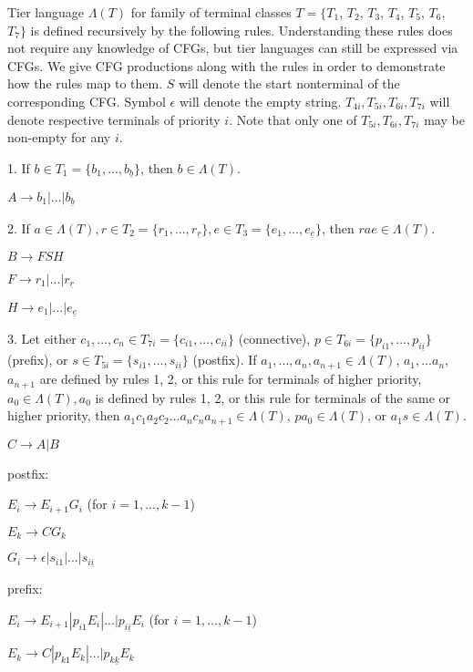 \documentclass{llncs}
\begin{document}
Tier language $\Lambda(T)$ for family of terminal classes $T = \{ T_1$, $T_2$, $T_3$, $T_4$, $T_5$, $T_6$, $T_7 \}$ is defined recursively by the following rules. Understanding these rules does not require any knowledge of CFGs, but tier languages can still be expressed via CFGs. We give CFG productions along with the rules in order to demonstrate how the rules map to them. $S$ will denote the start nonterminal of the corresponding CFG. Symbol $\epsilon$ will denote the empty string. $T_{4i}, T_{5i}, T_{6i}, T_{7i}$ will denote respective terminals of priority $i$. Note that only one of $T_{5i}, T_{6i}, T_{7i}$ may be non-empty for any $i$.

1. If $b \in T_1 = \{ b_1,...,b_{\underline b} \}$, then $b \in \Lambda(T)$.

\noindent
$A \rightarrow b_1 | ... | b_{\underline b}$

2. If $a \in \Lambda(T),  r \in T_2 = \{ r_1,...,r_{\underline r} \},  e \in T_3 = \{ e_1,...,e_{\underline e} \}$, then  $r a e \in  \Lambda(T)$.

\noindent
$B \rightarrow F S H$

\noindent
$F \rightarrow r_1 | ... | r_{\underline r}$

\noindent
$H \rightarrow e_1 | ... | e_{\underline e}$

3. Let either $c_1,...,c_n \in T_{7i} = \{ c_{i1},...,c_{i \underline i} \}$ (connective), $p \in T_{6i} = \{ p_{i1},...,p_{i \underline i} \}$ (prefix), or $s \in T_{5i} = \{ s_{i1},...,s_{i \underline i} \}$ (postfix). If $a_1,...,a_n, a_{n+1} \in \Lambda(T)$, $a_1,...a_n$, $a_{n+1}$ are defined by rules 1, 2, or this rule for terminals of higher priority, $a_0 \in \Lambda(T), a_0$ is defined by rules 1, 2, or this rule for terminals of the same or higher priority, then $a_1 c_1 a_2 c_2 ... a_n c_n a_{n+1} \in \Lambda(T)$, $p a_0 \in \Lambda(T)$, or $a_1 s \in \Lambda(T)$.

\noindent
$C \rightarrow A | B$

postfix:

\noindent
$E_i \rightarrow E_{i+1} G_i$ (for $i = 1,...,k-1$)

\noindent 
$E_k \rightarrow C G_k$

\noindent
$G_i \rightarrow \epsilon | s_{i1} | ... | s_{i \underline i}$

prefix:

\noindent
$E_i \rightarrow E_{i+1} | p_{i1} E_i | ... | p_{i \underline i} E_i$ (for $i = 1,...,k-1$)

\noindent
$E_k \rightarrow C | p_{k1} E_k | ... | p_{k \underline k} E_k$
\end{document}

